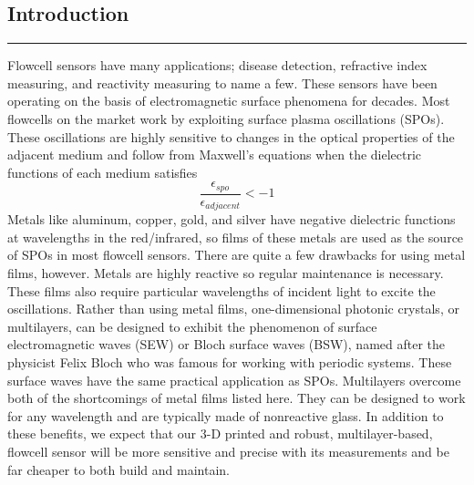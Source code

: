 \documentclass{report}
\begin{document}
	\selectfont
	\begin{flushleft}
	\section*{Introduction}
	\vspace{-0.1cm}\hrule\vspace{0.2cm}
	\par{Flowcell sensors have many applications; disease detection, refractive index measuring, and reactivity measuring to name a few. These sensors have been operating on the basis of electromagnetic surface phenomena for decades. Most flowcells on the market work by exploiting surface plasma oscillations (SPOs). These oscillations are highly sensitive to changes in the optical properties of the adjacent medium and follow from Maxwell's equations when the dielectric functions of each medium satisfies 
	\[
		\frac{\epsilon_{spo}}{\epsilon_{adjacent}} < -1
	\]
	Metals like aluminum, copper, gold, and silver have negative dielectric functions at wavelengths in the red/infrared, so films of these metals are used as the source of SPOs in most flowcell sensors. There are quite a few drawbacks for using metal films, however. Metals are highly reactive so regular maintenance is necessary. These films also require particular wavelengths of incident light to excite the oscillations. Rather than using metal films, one-dimensional photonic crystals, or multilayers, can be designed to exhibit the phenomenon of surface electromagnetic waves (SEW) or Bloch surface waves (BSW), named after the physicist Felix Bloch who was famous for working with periodic systems. These surface waves have the same practical application as SPOs. Multilayers overcome both of the shortcomings of metal films listed here. They can be designed to work for any wavelength and are typically made of nonreactive glass. In addition to these benefits, we expect that our 3-D printed and robust, multilayer-based, flowcell sensor will be more sensitive and precise with its measurements and be far cheaper to both build and maintain.}

\end{flushleft}
\end{document}
